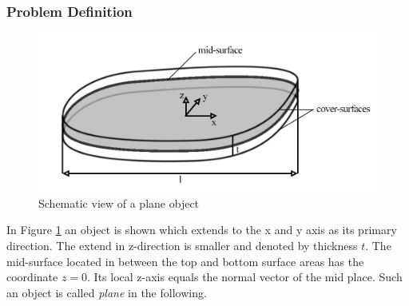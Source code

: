  \subsubsection{Problem Definition}\label{sec:Shell-Plane-ProbDef}
  \begin{figure}[htbp]%
\centering
\includegraphics[width=0.97\linewidth]{figures/plane}
\caption{Schematic view of a plane object}
\label{fig:plane}
\end{figure}
  In Figure \ref{fig:plane} an object is shown which extends to the x and y axis as its primary direction. The extend in z-direction is smaller and denoted by thickness $t$. The mid-surface located in between the top and bottom surface areas has the coordinate $z=0$. Its local z-axis equals the normal vector of the mid place. Such an object is called \textit{plane} in the following.
  
